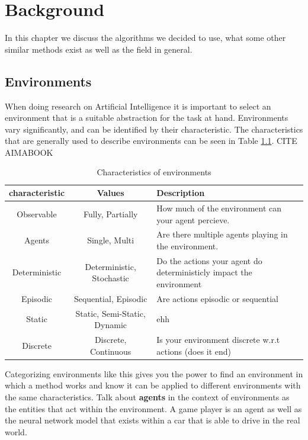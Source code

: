 \chapter{Background\label{cha:background}}

In this chapter we discuss the algorithms we decided to use, what some other similar 
methods exist as well as the field in general.

\section{Environments}
\label{sec:environments}

When doing research on Artificial Intelligence it is important to select 
an environment that is a suitable abstraction for the task at hand. Environments vary 
significantly, and can be identified by their characteristic. The characteristics 
that are generally used to describe environments can be seen in Table \ref{tab:env_characteristics}. 
CITE AIMABOOK

\begin{table}[h]
  \centering
  \begin{tabular}{|c|c|p{6cm}|}
    \hline
    \textbf{characteristic} & \textbf{Values} & \textbf{Description}\\
    \hline
    Observable & Fully, Partially & How much of the environment can your agent percieve.\\
    \hline
    Agents & Single, Multi & Are there multiple agents playing in the environment.\\
    \hline
    Deterministic & Deterministic, Stochastic & Do the actions your agent do deterministicly impact the environment\\
    \hline
    Episodic & Sequential, Episodic & Are actions episodic or sequential\\
    \hline
    Static & Static, Semi-Static, Dynamic & ehh  \\
    \hline
    Discrete & Discrete, Continuous & Is your environment discrete w.r.t actions (does it end) \\
    \hline
  \end{tabular}
  \caption{Characteristics of environments}
  \label{tab:env_characteristics}
\end{table}

Categorizing environments like this gives you the power to find an environment in which 
a method works and know it can be applied to different environments with the same characteristics.
Talk about \textbf{agents} in the context of environments as the entities that act within the 
environment. A game player is an agent as well as the neural network model that exists within 
a car that is able to drive in the real world.

